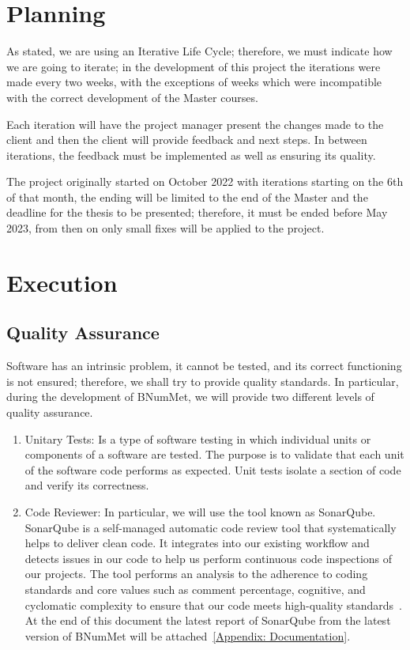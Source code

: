 \section{Planning}
As stated, we are using an Iterative Life Cycle; therefore, we must indicate how we are going to iterate; in the development of this project the iterations were made every two weeks, with the exceptions of weeks which were incompatible with the correct development of the Master courses.

Each iteration will have the project manager present the changes made to the client and then the client will provide feedback and next steps. In between iterations, the feedback must be implemented as well as ensuring its quality.

The project originally started on October 2022 with iterations starting on the 6th of that month, the ending will be limited to the end of the Master and the deadline for the thesis to be presented; therefore, it must be ended before May 2023, from then on only small fixes will be applied to the project.

\section{Execution}
\subsection{Quality Assurance}
Software has an intrinsic problem, it cannot be tested, and its correct functioning is not ensured; therefore, we shall try to provide quality standards. In particular, during the development of BNumMet, we will provide two different levels of quality assurance.
\begin{enumerate}
    \item Unitary Tests: Is a type of software testing in which individual units or components of a software are tested. The purpose is to validate that each unit of the software code performs as expected.  Unit tests isolate a section of code and verify its correctness. 
    
    \item Code Reviewer: In particular, we will use the tool known as SonarQube. SonarQube is a self-managed automatic code review tool that systematically helps to deliver clean code. It integrates into our existing workflow and detects issues in our code to help us perform continuous code inspections of our projects. The tool performs an analysis to the adherence to coding standards and core values such as comment percentage, cognitive, and cyclomatic complexity to ensure that our code meets high-quality standards~\cite{sonarsource, sonarqube}. At the end of this document the latest report of SonarQube from the latest version of BNumMet will be attached~\hyperlink{Appendix:Documentation}{[Appendix: Documentation]}.
\end{enumerate}


